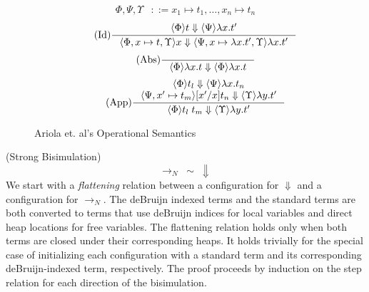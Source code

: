 \begin{figure}
\begin{align*}
\tag{Heap} \Phi, \Psi, \Upsilon &::= x_1 \mapsto t_1, \dots, x_n \mapsto t_n
\end{align*}
\begin{align*}
\tag{Id} \inference
{\langle \Phi \rangle t \Downarrow \langle \Psi \rangle \lambda x.t'}
{\langle \Phi, x \mapsto t, \Upsilon \rangle x \Downarrow \langle \Psi, x
\mapsto \lambda x.t', \Upsilon \rangle \lambda x.t'}
\end{align*}
\begin{align*}
\tag{Abs} \inference 
{}
{\langle \Phi \rangle \lambda x . t \Downarrow \langle \Phi \rangle \lambda x.t}
\end{align*}
\begin{align*}
\tag{App} \inference
{\langle \Phi \rangle t_l \Downarrow \langle \Psi \rangle \lambda 
x.t_n \\ \langle \Psi, x' \mapsto t_m \rangle [x'/x]t_n \Downarrow \langle
\Upsilon \rangle \lambda y.t'}
{\langle \Phi \rangle t_l \; t_m \Downarrow \langle \Upsilon \rangle \lambda y.t'}
\end{align*}
\caption{Ariola et. al's Operational Semantics}
\label{fig:cbn}
\end{figure}

{\theorem \textnormal{(Strong Bisimulation)} $$\xrightarrow{}_{N} \; \sim \;
\Downarrow$$}
We start with a \emph{flattening} relation between a configuration for
$\Downarrow$ and a configuration for $\xrightarrow{}_{N}$. The deBruijn indexed
terms and the standard terms are both converted to terms that use deBruijn
indices for local variables and direct heap locations for free variables. The
flattening relation holds only when both terms are closed under their
corresponding heaps. It holds trivially for the special case of initializing
each configuration with a standard term and its corresponding deBruijn-indexed
term, respectively. The proof proceeds by induction on the step relation for
each direction of the bisimulation.

